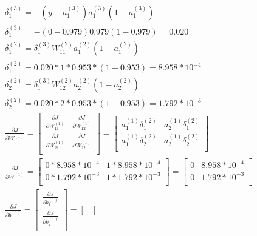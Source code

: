 \documentclass[leqno]{article}
\begin{document}
\begin{gather*}
\begin{split}
&\delta_1^{(3)} = %
  -(y - a_1^{(3)})a_1^{(3)}(1 - a_1^{(3)})\\
&\delta_1^{(3)} = -(0 - 0.979)0.979(1 - 0.979) = 0.020\\
&\delta_1^{(2)} = %
  \delta_1^{(3)}W_{11}^{(2)}a_1^{(2)}(1 - a_1^{(2)})\\
&\delta_1^{(2)} = 0.020*1*0.953*(1 - 0.953) = 8.958*10^{-4}\\
&\delta_2^{(2)} = %
  \delta_1^{(3)}W_{12}^{(2)}a_2^{(2)}(1 - a_2^{(2)})\\
&\delta_2^{(2)} = 0.020 * 2 * 0.953*(1- 0.953) = 1.792*10^{-3}\\
&\frac{\partial J}{\partial W^{(1)}} = 
 \begin{bmatrix}
   \frac{\partial J}{\partial W_{11}^{(1)}} & \frac{\partial J}{\partial W_{12}^{(1)}}\\ 
  \frac{\partial J}{\partial W_{21}^{(1)}} & \frac{\partial J}{\partial W_{22}^{(1)}}\\
  \end{bmatrix}
   =
 \begin{bmatrix}
   a_1^{(1)}\delta_1^{(2)} & a_2^{(1)}\delta_1^{(2)}\\ 
   a_1^{(1)}\delta_2^{(2)} & a_2^{(1)}\delta_2^{(2)}\\
  \end{bmatrix}\\
& \frac{\partial J}{\partial W^{(1)}} =
  \begin{bmatrix}
   0*8.958*10^{-4} & 1*8.958*10^{-4}\\ 
   0*1.792*10^{-3} & 1*1.792*10^{-3}\\
  \end{bmatrix}
 =
  \begin{bmatrix}
   0 & 8.958*10^{-4}\\ 
   0 & 1.792*10^{-3}\\
  \end{bmatrix}
\\
&\frac{\partial J}{\partial b^{(1)}} = 
 \begin{bmatrix}
   \frac{\partial J}{\partial b_1^{(1)}}\\ 
  \frac{\partial J}{\partial b_2^{(1)}}\\
  \end{bmatrix}
  =
 \begin{bmatrix}

\end{bmatrix}
\end{split}
\end{gather*}
\end{document}
